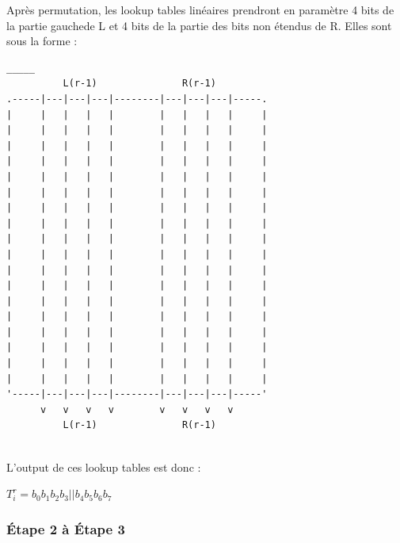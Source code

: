 \documentclass[a4paper,12pt]{article}
\begin{document}
\begin{enumerate}
Après permutation, les lookup tables linéaires prendront en paramètre 4 bits de la partie gauchede L et 4 bits de la partie des bits non étendus de R. Elles sont sous la forme :

\begin{Verbatim}[samepage=true]
                               _____
          L(r-1)               R(r-1)
.-----|---|---|---|--------|---|---|---|-----.
|     |   |   |   |        |   |   |   |     |
|     |   |   |   |        |   |   |   |     |
|     |   |   |   |        |   |   |   |     |  
|     |   |   |   |        |   |   |   |     | 
|     |   |   |   |        |   |   |   |     |
|     |   |   |   |        |   |   |   |     |
|     |   |   |   |        |   |   |   |     |
|     |   |   |   |        |   |   |   |     | 
|     |   |   |   |        |   |   |   |     | 
|     |   |   |   |        |   |   |   |     | 
|     |   |   |   |        |   |   |   |     |             
|     |   |   |   |        |   |   |   |     |              
|     |   |   |   |        |   |   |   |     |             
|     |   |   |   |        |   |   |   |     |               
|     |   |   |   |        |   |   |   |     |                
|     |   |   |   |        |   |   |   |     |     
|     |   |   |   |        |   |   |   |     | 
|     |   |   |   |        |   |   |   |     |  
'-----|---|---|---|--------|---|---|---|-----'
      v   v   v   v        v   v   v   v 
          L(r-1)               R(r-1)
 
\end{Verbatim}	

L'output de ces lookup tables est donc :
\medskip
\begin{center}
$T_i^r = b_0 b_1 b_2 b_3||b_4 b_5 b_6 b_7$
\end{center}
\medskip
\end{enumerate}



		
\subsubsection{Étape 2 à Étape 3}
\end{document}
